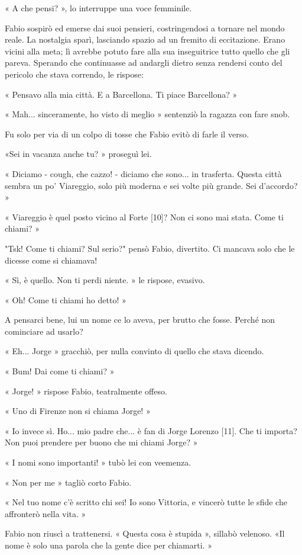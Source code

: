 « A che pensi? », lo interruppe una voce femminile.

Fabio sospirò ed emerse dai suoi pensieri, costringendosi a tornare nel mondo reale. La nostalgia sparì, lasciando spazio ad un fremito di eccitazione. Erano vicini alla meta; lì avrebbe potuto fare alla sua inseguitrice tutto quello che gli pareva. Sperando che continuasse ad andargli dietro senza rendersi conto del pericolo che stava correndo, le rispose:

« Pensavo alla mia città. E a Barcellona. Ti piace Barcellona? »

« Mah... sinceramente, ho visto di meglio » sentenziò la ragazza con fare snob.

Fu solo per via di un colpo di tosse che Fabio evitò di farle il verso.

«Sei in vacanza anche tu? » proseguì lei.

« Diciamo - cough, che cazzo! - diciamo che sono... in trasferta. Questa città sembra un po' Viareggio, solo più moderna e sei volte più grande. Sei d'accordo? »

« Viareggio è quel posto vicino al Forte [10]? Non ci sono mai stata. Come ti chiami? »

"Tsk! Come ti chiami? Sul serio?" pensò Fabio, divertito. Ci mancava solo che le dicesse come si chiamava!

« Sì, è quello. Non ti perdi niente. » le rispose, evasivo.

« Oh! Come ti chiami ho detto! »

A pensarci bene, lui un nome ce lo aveva, per brutto che fosse. Perché non cominciare ad usarlo?

« Eh... Jorge » gracchiò, per nulla convinto di quello che stava dicendo.

« Bum! Dai come ti chiami? »

« Jorge! » rispose Fabio, teatralmente offeso.

« Uno di Firenze non si chiama Jorge! »

« Io invece sì. Ho... mio padre che... è fan di Jorge Lorenzo [11]. Che ti importa? Non puoi prendere per buono che mi chiami Jorge? »

« I nomi sono importanti! » tubò lei con veemenza.

« Non per me » tagliò corto Fabio.

« Nel tuo nome c'è scritto chi sei! Io sono Vittoria, e vincerò tutte le sfide che affronterò nella vita. »

Fabio non riuscì a trattenersi. « Questa cosa è stupida », sillabò velenoso. «Il nome è solo una parola che la gente dice per chiamarti. »

